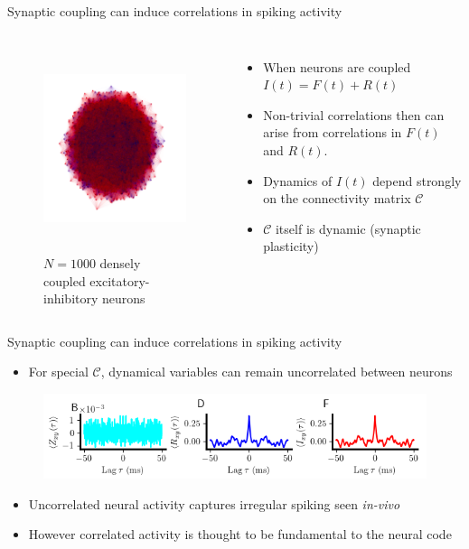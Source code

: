 \documentclass[aspectratio=169]{beamer}
\begin{document}
\begin{frame}{Synaptic coupling can induce correlations in spiking activity}

\begin{columns}
\begin{figure}
\caption{$N=1000$ densely coupled excitatory-inhibitory neurons}
\includegraphics[height=60mm, width=70mm]{figure-17}
\end{figure}
\begin{itemize}
\item When neurons are coupled $I(t) = F(t) + R(t)$
\item Non-trivial correlations then can arise from correlations in $F(t)$ and $R(t)$.
\item Dynamics of $I(t)$ depend strongly on the connectivity matrix $\mathcal{C}$
\item $\mathcal{C}$ itself is dynamic (synaptic plasticity)
\end{itemize}

\end{columns} 

\end{frame}


\begin{frame}{Synaptic coupling can induce correlations in spiking activity}

\begin{itemize}
\item For special $\mathcal{C}$, dynamical variables can remain uncorrelated between neurons
\end{itemize}


\begin{figure}
\centering
\includegraphics[width=140mm]{figure-12-1}
\end{figure}

\begin{itemize}
\item Uncorrelated neural activity captures irregular spiking seen \emph{in-vivo}
\item However correlated activity is thought to be fundamental to the neural code
\end{itemize}

\end{frame}
\end{document}
